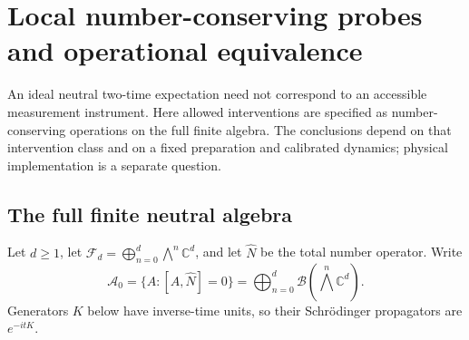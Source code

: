 \documentclass[11pt]{article}
\theoremstyle{definition}
\begin{document}
\section{Local number-conserving probes and operational equivalence}
\label{app:neutral-clock}

An ideal neutral two-time expectation need not correspond to an accessible
measurement instrument. Here allowed interventions are specified as
number-conserving operations on the full finite algebra. The conclusions
depend on that intervention class and on a fixed preparation and calibrated
dynamics; physical implementation is a separate question.

\subsection{The full finite neutral algebra}

Let $d\ge1$, let
$\mathcal F_d=\bigoplus_{n=0}^d\bigwedge^n\mathbb C^d$, and let
$\widehat N$ be the total number operator. Write
\[
 \mathcal A_0=\{A:[A,\widehat N]=0\}
   =\bigoplus_{n=0}^d\mathcal B(\textstyle\bigwedge^n\mathbb C^d).
\]
Generators $K$ below have inverse-time units, so their Schr\"odinger
propagators are $e^{-itK}$.
\end{document}
